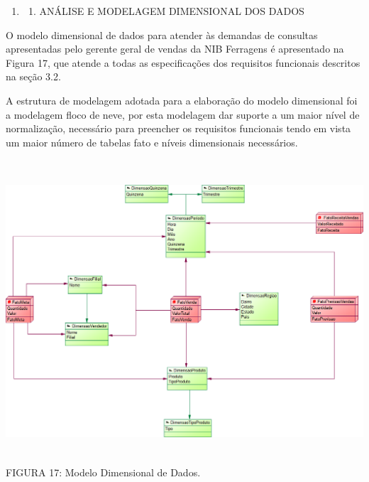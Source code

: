 \documentclass[a4paper]{article}
\newcounter{saveenum}
\newcommand\liststyleWWviiiNumi{%
\renewcommand\theenumi{\arabic{enumi}}
\renewcommand\theenumii{\arabic{enumi}.\arabic{enumii}}
\renewcommand\theenumiii{\arabic{enumi}.\arabic{enumii}.\arabic{enumiii}}
\renewcommand\theenumiv{\arabic{enumi}.\arabic{enumii}.\arabic{enumiii}.\arabic{enumiv}}
\renewcommand\labelenumi{\theenumi}
\renewcommand\labelenumii{\theenumii}
\renewcommand\labelenumiii{\theenumiii}
\renewcommand\labelenumiv{\theenumiv.}
}
\begin{document}
\bigskip

\liststyleWWviiiNumi
\setcounter{saveenum}{\value{enumi}}
\begin{enumerate}
\setcounter{enumi}{\value{saveenum}}
\item \setcounter{saveenum}{\value{enumii}}
\begin{enumerate}
\setcounter{enumii}{\value{saveenum}}
\item {\sffamily
AN\'ALISE E MODELAGEM DIMENSIONAL DOS DADOS}
\end{enumerate}
\end{enumerate}
{
\textsf{O modelo dimensional de dados para atender \`as demandas de consultas apresentadas pelo gerente geral de vendas
da NIB Ferragens \'e apresentado na Figura 17, que atende a todas as especifica\c{c}\~oes dos requisitos funcionais
descritos na se\c{c}\~ao 3.2. }}

{\sffamily
A estrutura de modelagem adotada para a elabora\c{c}\~ao do modelo dimensional foi a modelagem floco de neve, por esta
modelagem dar suporte a um maior n\'ivel de normaliza\c{c}\~ao, necess\'ario para preencher os requisitos funcionais
tendo em vista um maior n\'umero de tabelas fato e n\'iveis dimensionais necess\'arios.}

{
 \includegraphics[width=15.997cm,height=11.264cm]{monograph-img017.png} \newline
\newline
\textsf{\MakeUppercase{FIGURA 17}}\textsf{: Modelo Dimensional de Dados. }}
\end{document}
